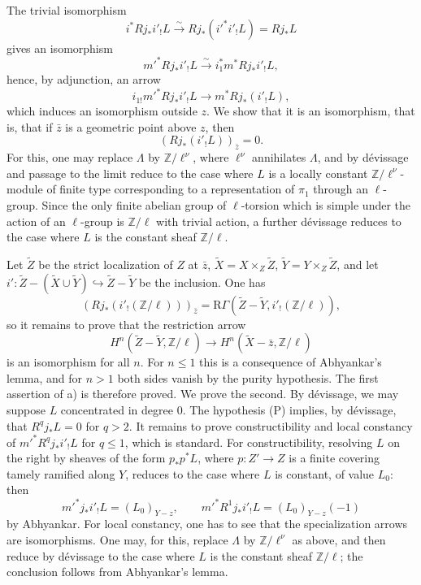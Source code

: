 \documentclass[11pt]{article}
\begin{document}
The trivial isomorphism
\[
i^*Rj_*i'_!L\xrightarrow{\sim}Rj_*(i'^*i'_!L)=Rj_*L
\]
gives an isomorphism
\[
m'^*Rj_*i'_!L\xrightarrow{\sim} i_1^*m^*Rj_*i'_!L,
\]
hence, by adjunction, an arrow
\[
i_{1!}m'^*Rj_*i'_!L\longrightarrow m^*Rj_*(i'_!L),
\]
which induces an isomorphism outside $z$. We show that it is an isomorphism, that is, that if $\bar z$ is a geometric point above $z$, then
\[
(Rj_*(i'_!L))_{\bar z}=0.
\]
For this, one may replace $\Lambda$ by $\mathbb Z/\ell^\nu$, where $\ell^\nu$ annihilates $\Lambda$, and by dévissage and passage to the limit reduce to the case where $L$ is a locally constant $\mathbb Z/\ell^\nu$-module of finite type corresponding to a representation of $\pi_1$ through an $\ell$-group. Since the only finite abelian group of $\ell$-torsion which is simple under the action of an $\ell$-group is $\mathbb Z/\ell$ with trivial action, a further dévissage reduces to the case where $L$ is the constant sheaf $\mathbb Z/\ell$.

Let $\widetilde Z$ be the strict localization of $Z$ at $\bar z$, $\widetilde X=X\times_Z\widetilde Z$, $\widetilde Y=Y\times_Z\widetilde Z$, and let $i':\widetilde Z-(\widetilde X\cup\widetilde Y)\hookrightarrow \widetilde Z-\widetilde Y$ be the inclusion. One has
\[
(Rj_*(i'_!(\mathbb Z/\ell)))_{\bar z}
=\mathrm R\Gamma(\widetilde Z-\widetilde Y,i'_!(\mathbb Z/\ell)),
\]
so it remains to prove that the restriction arrow
\[
H^n(\widetilde Z-\widetilde Y,\mathbb Z/\ell)
\longrightarrow
H^n(\widetilde X-\bar z,\mathbb Z/\ell)
\]
is an isomorphism for all $n$. For $n\le1$ this is a consequence of Abhyankar's lemma, and for $n>1$ both sides vanish by the purity hypothesis. The first assertion of a) is therefore proved. We prove the second. By dévissage, we may suppose $L$ concentrated in degree $0$. The hypothesis (P) implies, by dévissage, that $R^qj_*L=0$ for $q>2$. It remains to prove constructibility and local constancy of $m'^*R^qj_*i'_!L$ for $q\le1$, which is standard. For constructibility, resolving $L$ on the right by sheaves of the form $p_*p^*L$, where $p:Z'\to Z$ is a finite covering tamely ramified along $Y$, reduces to the case where $L$ is constant, of value $L_0$: then
\[
m'^*j_*i'_!L=(L_0)_{Y-z},
\qquad
m'^*R^1j_*i'_!L=(L_0)_{Y-z}(-1)
\]
by Abhyankar. For local constancy, one has to see that the specialization arrows are isomorphisms. One may, for this, replace $\Lambda$ by $\mathbb Z/\ell^\nu$ as above, and then reduce by dévissage to the case where $L$ is the constant sheaf $\mathbb Z/\ell$; the conclusion follows from Abhyankar's lemma.
\end{document}
